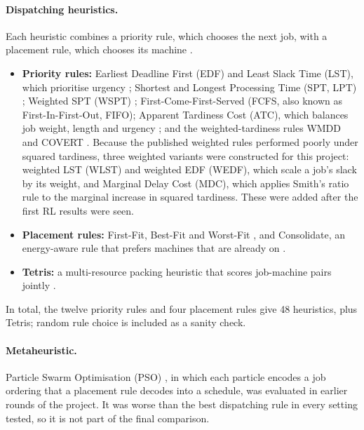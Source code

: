 \documentclass[12pt]{article}
\begin{document}
\paragraph{Dispatching heuristics.} Each heuristic combines a priority rule, which chooses the next job, with a placement rule, which chooses its machine \cite{pinedo2016scheduling}.
\begin{itemize}
    \item \textbf{Priority rules:} Earliest Deadline First (EDF) and Least Slack Time (LST), which prioritise urgency \cite{pinedo2016scheduling}; Shortest and Longest Processing Time (SPT, LPT) \cite{pinedo2016scheduling, graham1969lpt}; Weighted SPT (WSPT) \cite{smith1956wspt}; First-Come-First-Served (FCFS, also known as First-In-First-Out, FIFO); Apparent Tardiness Cost (ATC), which balances job weight, length and urgency \cite{vepsalainen1987atc}; and the weighted-tardiness rules WMDD \cite{kanet2004wmdd} and COVERT \cite{carroll1965covert}. Because the published weighted rules performed poorly under squared tardiness, three weighted variants were constructed for this project: weighted LST (WLST) and weighted EDF (WEDF), which scale a job's slack by its weight, and Marginal Delay Cost (MDC), which applies Smith's ratio rule \cite{smith1956wspt} to the marginal increase in squared tardiness. These were added after the first RL results were seen.
    \item \textbf{Placement rules:} First-Fit, Best-Fit and Worst-Fit \cite{johnson1973binpacking}, and Consolidate, an energy-aware rule that prefers machines that are already on \cite{energyaware2012}.
    \item \textbf{Tetris:} a multi-resource packing heuristic that scores job-machine pairs jointly \cite{grandl2014tetris}.
\end{itemize}

In total, the twelve priority rules and four placement rules give 48 heuristics, plus Tetris; random rule choice is included as a sanity check.

\paragraph{Metaheuristic.} Particle Swarm Optimisation (PSO) \cite{kennedy1995pso}, in which each particle encodes a job ordering that a placement rule decodes into a schedule, was evaluated in earlier rounds of the project. It was worse than the best dispatching rule in every setting tested, so it is not part of the final comparison.
\end{document}
